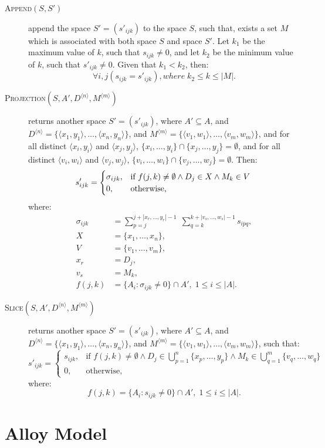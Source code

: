 \documentclass{article}
\begin{document}
\begin{description}
	\item[\textsc{Append}$(S,S')$] append the space
	$S'=\left(s'_{ijk}\right)$ to the space $S$,
		such that, exists a set $M$ which is associated with both space $S$ and
		space $S'$. Let $k_1$ be the maximum value of $k$, such that
		$s_{ijk} \neq 0$, and let $k_2$ be the minimum value of $k$,
		such that $s'_{ijk} \neq 0$. Given that $k_1 < k_2$, then:
		\[
			\forall i,j\left(s_{ijk} = s'_{ijk}\right), where \; k_2 \leq k \leq |M|.
		\]

	\item[\textsc{Projection}$(S, A', D^{\langle n \rangle}, M^{\langle m \rangle})$] 
		returns another space $S'=\left(s'_{ijk}\right)$,
		where $A' \subseteq A$, and $D^{\langle n \rangle} = 
		\{\langle x_1, y_1 \rangle, \ldots, \langle x_n, y_n \rangle\}$, and
		$M^{\langle m \rangle} = 
		\{\langle v_1, w_1 \rangle, \ldots, \langle v_m, w_m \rangle \}$, and
		for all distinct $\langle x_i, y_i \rangle$ and $\langle x_j, y_j \rangle$,
		$\{x_i,\ldots,y_i\} \cap \{x_j,\ldots,y_j\} = \emptyset$, and
		for all distinct $\langle v_i, w_i \rangle$ and $\langle v_j, w_j \rangle$,
		$\{v_i,\ldots,w_i\} \cap \{v_j,\ldots,w_j\} = \emptyset$. Then:
		\[
			s'_{ijk} = 
			\begin{cases}
				\sigma_{ijk}, & 
					\text{if } f(j, k) \neq \emptyset \land 
						D_j \in X \land M_k \in V \\
				0, & \text{otherwise},
			\end{cases} \\
		\]
		where:
		\begin{align*}
			\sigma_{ijk} &= \sum_{p=j}^{j+|x_r, \ldots, y_r|-1} \;
				{\sum_{q=k}^{k+|v_s, \ldots, w_s|-1}{s_{ipq}}}, \\
			X &= \{ x_1, \ldots, x_n \}, \\
			V &= \{ v_1, \ldots, v_m \}, \\
			x_r &= D_j, \\
			v_s &= M_k, \\
			f(j,k) &= \{ A_i : \sigma_{ijk} \neq 0 \} \cap A', \; 1 \leq i \leq |A|.
		\end{align*}

	\item[\textsc{Slice}$(S, A', D^{\langle n \rangle}, M^{\langle m \rangle})$] 
		returns another space $S'=\left(s'_{ijk}\right)$, 
		where $A' \subseteq A $, and $D^{\langle n \rangle} = 
		\{\langle x_1, y_1 \rangle, \ldots, \langle x_n, y_n \rangle\}$, and
		$M^{\langle m \rangle} = 
		\{\langle v_1, w_1 \rangle, \ldots, \langle v_m, w_m \rangle \}$,
		such that:
		\[
			s'_{ijk} = 
			\begin{cases}
				s_{ijk}, & \text{if } 
					f(j, k) \neq \emptyset \land
					D_j \in \bigcup\limits_{p=1}^{n} \{ x_p, \ldots, y_p \} \land 
					M_k \in \bigcup\limits_{q=1}^{m} \{ v_q, \ldots, w_q \} \\
				0, & \text{otherwise},
			\end{cases}
		\]
		where:
		\[
			f(j,k) = \{ A_i : s_{ijk} \neq 0 \} \cap A', \; 1 \leq i \leq |A|.
		\]

\end{description}

\section{Alloy Model} %
\label{sec:alloy_model}


\end{document}
